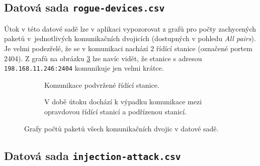 \newpage

\subsection*{Datová sada \texttt{rogue-devices.csv}}

Útok v této datové sadě lze v aplikaci vypozorovat z grafů pro počty zachycených paketů v~jednotlivých komunikačních dvojicích (dostupných v pohledu \emph{All pairs}). Je velmi podezřelé, že se v komunikaci nachází 2 řídící stanice (označené portem 2404). Z grafů na obrázku \ref{fig:rogue_both} lze navíc vidět, že stanice s adresou \texttt{198.168.11.246:2404} komunikuje jen velmi krátce.



\begin{figure}[H]%
    \centering
    \begin{subfigure}{\textwidth}
        \centering
        \captionsetup{width=0.9\linewidth}
        \caption{Komunikace podvržené řídící stanice.}
        \label{fig:rogue_attacker}
    \end{subfigure}
    
    \begin{subfigure}{\textwidth}
        \centering
        \captionsetup{width=0.9\linewidth}
        \caption{V době útoku dochází k výpadku komunikace mezi opravdovou řídící stanicí a podřízenou stanicí.}
        \label{fig:rogue_real}
    \end{subfigure}
    
    
    \caption{Grafy počtů paketů všech komunikačních dvojic v datové sadě.}%
    \label{fig:rogue_both}%
\end{figure}


\subsection*{Datová sada \texttt{injection-attack.csv}}

